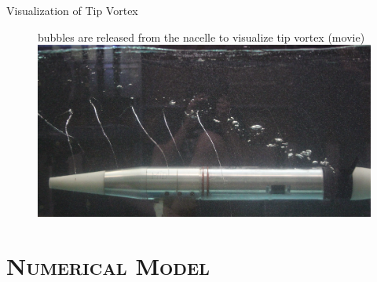 \documentclass[xcolor=x11names,compress]{beamer}
\begin{document}
	\begin{frame}{Visualization of Tip Vortex}

		\begin{figure}[p]
		    \item bubbles are released from the nacelle to visualize tip vortex (movie)
		    \centering
		    \includegraphics[width=1.0\textwidth]{figures/turbine_tip_vortex_and_bubbles.png}
		\end{figure}


	\end{frame}

\section{\scshape Numerical Model}
\end{document}
